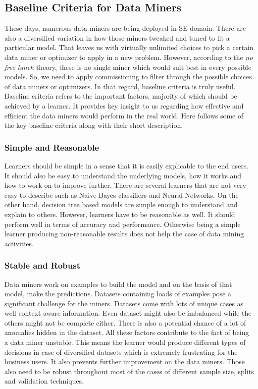\documentclass[sigplan]{acmart}\settopmatter{printfolios=true,printccs=false,printacmref=false}
\begin{document}
\subsection{Baseline Criteria for Data Miners} These days, numerous data miners are being deployed in SE domain. There are also a diversified variation in how those miners tweaked and tuned to fit a particular model. That leaves us with virtually unlimited choices to pick a certain data miner or optimizer to apply in a new problem. However, according to the \textit{no free lunch} theory, these is no single miner which would suit best in every possible models. So, we need to apply commissioning to filter through the possible choices of data miners or optimizers. In that regard, baseline criteria is truly useful. Baseline criteria refers to the important factors, majority of which should be achieved by a learner. It provides key insight to us regarding how effective and efficient the data miners would perform in the real world. Here follows some of the key baseline criteria along with their short description. 

\subsubsection{Simple and Reasonable}
Learners should be simple in a sense that it is easily explicable to the end users. It should also be easy to understand the underlying models, how it works and how to work on to improve further. There are several learners that are not very easy to describe such as Naive Bayes classifiers and Neural Networks. On the other hand, decision tree based models are simple enough to understand and explain to others. However, learners have to be reasonable as well. It should perform well in terms of accuracy and performance. Otherwise being a simple learner producing non-reasonable results does not help the case of data mining activities. 

\subsubsection{Stable and Robust}
Data miners work on examples to build the model and on the basis of that model, make the predictions. Datasets containing loads of examples pose a significant challenge for the miners. Datasets come with lots of unique cases as well context aware information. Even dataset might also be imbalanced while the others might not be complete either. There is also a potential chance of a lot of anomalies hidden in the dataset. All these factors contribute to the fact of being a data miner unstable. This means the learner would produce different types of decisions in case of diversified datasets which is extremely frustrating for the business users. It also prevents further improvement on the data miners. Those also need to be robust throughout most of the cases of different sample size, splits and validation techniques.  
\end{document}
